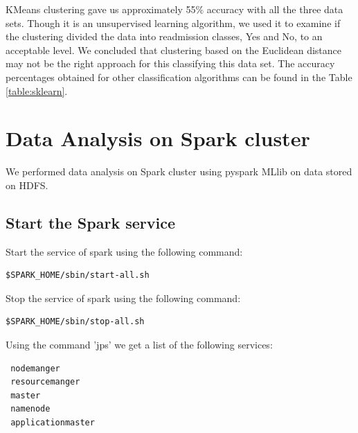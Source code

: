 \documentclass[9pt,twocolumn,twoside]{../../styles/osajnl}
\begin{document}
KMeans clustering gave us approximately 55$\%$ accuracy with all the three data sets.  Though it is an unsupervised learning algorithm, we used it to examine if the clustering divided the data into readmission classes, Yes and No, to an acceptable level. We concluded that clustering based on the Euclidean distance may not be the right approach for this classifying this data set. The accuracy percentages obtained  for other classification algorithms can be found  in the Table \ref{table:sklearn}.




\section{Data Analysis on Spark cluster}
We performed data analysis on Spark cluster using pyspark MLlib on data stored on HDFS.

\subsection{Start the Spark service}

Start the service of spark using the following command:
\begin{verbatim}
$SPARK_HOME/sbin/start-all.sh
\end{verbatim}



Stop the service of spark using the following command:
\begin{verbatim}
$SPARK_HOME/sbin/stop-all.sh
\end{verbatim}


Using the command 'jps' we get a list of the following services:
\begin{verbatim}
 nodemanger
 resourcemanger
 master
 namenode
 applicationmaster
\end{verbatim}
\end{document}
